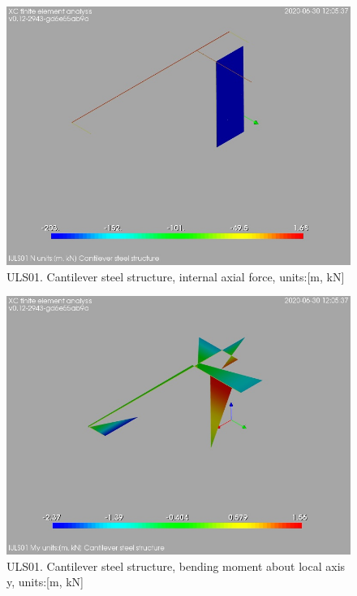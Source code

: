 \begin{figure}
\begin{center}
\includegraphics[width=\linewidth]{ramp_wall/resLC/text/graphics/resSimplLC/lULS01steelMembersN}
\caption{ULS01. Cantilever steel structure, internal axial force, units:[m, kN]}
\end{center}
\end{figure}
\begin{figure}
\begin{center}
\includegraphics[width=\linewidth]{ramp_wall/resLC/text/graphics/resSimplLC/lULS01steelMembersMy}
\caption{ULS01. Cantilever steel structure, bending moment about local axis y, units:[m, kN]}
\end{center}
\end{figure}
